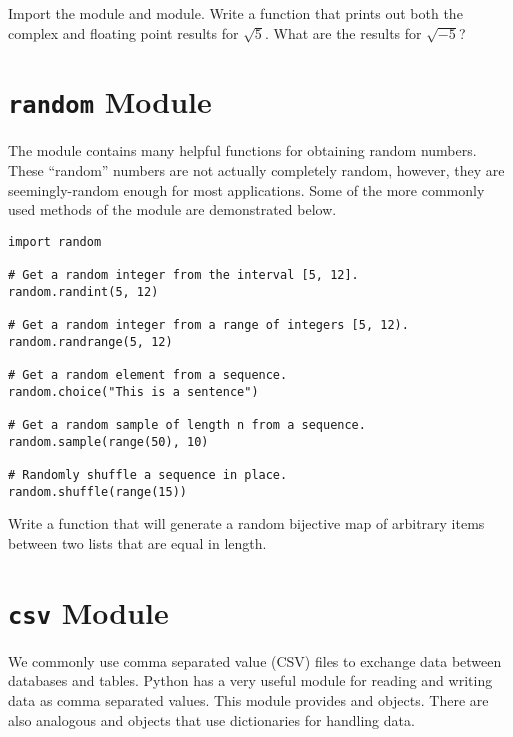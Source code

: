 \begin{problem}
Import the  module and  module. Write a function that prints out both the complex and floating point results for $\sqrt{5}$.  What are the results for $\sqrt{-5}$?
\end{problem}

\section*{\texttt{random} Module}
The  module contains many helpful functions for obtaining random numbers.
These ``random'' numbers are not actually completely random, however, they are seemingly-random enough for most applications.
Some of the more commonly used methods of the  module are demonstrated below.
\begin{lstlisting}
import random

# Get a random integer from the interval [5, 12].
random.randint(5, 12)

# Get a random integer from a range of integers [5, 12).
random.randrange(5, 12)

# Get a random element from a sequence.
random.choice("This is a sentence")

# Get a random sample of length n from a sequence.
random.sample(range(50), 10)

# Randomly shuffle a sequence in place.
random.shuffle(range(15))
\end{lstlisting}
\begin{comment}
The \li{random} module has functions that can sample from a variety of different statistical distributions such as: uniform, normal, beta, gamma, exponential, etc.
\end{comment}

\begin{problem}
Write a function that will generate a random bijective map of arbitrary items between two lists that are equal in length.
\label{prob:random_map}
\end{problem}

\section*{\texttt{csv} Module}
We commonly use comma separated value (CSV) files to exchange data between databases and tables.
Python has a very useful module for reading and writing data as comma separated values.
This  module provides  and  objects.
There are also analogous  and  objects that use dictionaries for handling data.

